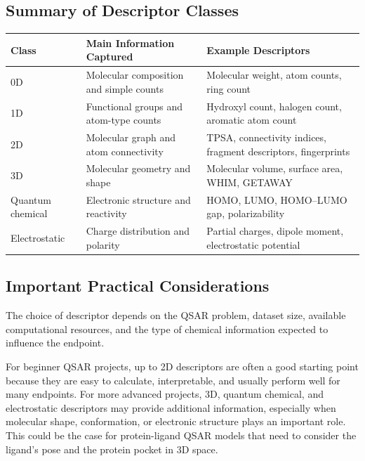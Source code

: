 \documentclass[11pt]{report}
\newenvironment{Important note}{\begin{quote}\color{red}\textbf{Important note:} }{\end{quote}}
\begin{document}
\subsection{Summary of Descriptor Classes}

\begin{center}
\begin{tabular}{p{}p{}p{}}
\toprule
\textbf{Class} & \textbf{Main Information Captured} & \textbf{Example Descriptors} \\
\midrule
0D & Molecular composition and simple counts & Molecular weight, atom counts, ring count \\
1D & Functional groups and atom-type counts & Hydroxyl count, halogen count, aromatic atom count \\
2D & Molecular graph and atom connectivity & TPSA, connectivity indices, fragment descriptors, fingerprints \\
3D & Molecular geometry and shape & Molecular volume, surface area, WHIM, GETAWAY \\
Quantum chemical & Electronic structure and reactivity & HOMO, LUMO, HOMO--LUMO gap, polarizability \\
Electrostatic & Charge distribution and polarity & Partial charges, dipole moment, electrostatic potential \\
\bottomrule
\end{tabular}
\end{center}

\subsection{Important Practical Considerations}

The choice of descriptor depends on the QSAR problem, dataset size, available computational resources, and the type of chemical information expected to influence the endpoint.

For beginner QSAR projects, up to 2D descriptors are often a good starting point because they are easy to calculate, interpretable, and usually perform well for many endpoints. For more advanced projects, 3D, quantum chemical, and electrostatic descriptors may provide additional information, especially when molecular shape, conformation, or electronic structure plays an important role. This could be the case for protein-ligand QSAR models that need to consider the ligand's pose and the protein pocket in 3D space. 
\end{document}
